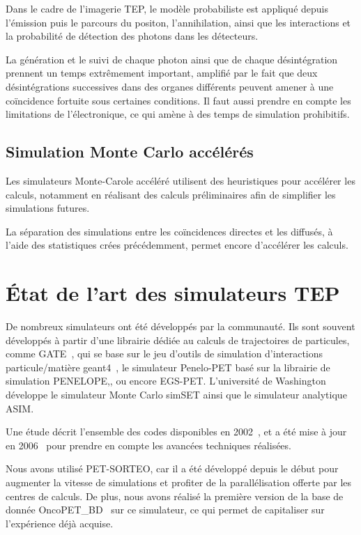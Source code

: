 Dans le cadre de l'imagerie TEP, le modèle probabiliste est appliqué depuis l'émission puis le parcours du positon, l'annihilation, ainsi que les interactions et la probabilité de détection des photons dans les détecteurs.

La génération et le suivi de chaque photon ainsi que de chaque désintégration prennent un temps extrêmement important, amplifié par le fait que deux désintégrations successives dans des organes différents peuvent amener à une coïncidence fortuite sous certaines conditions. Il faut aussi prendre en compte les limitations de l'électronique, ce qui amène à des temps de simulation prohibitifs.

		\subsection{Simulation Monte Carlo accélérés}

Les simulateurs Monte-Carole accéléré utilisent des heuristiques pour accélérer les calculs, notamment en réalisant des calculs préliminaires afin de simplifier les simulations futures. 

La séparation des simulations entre les coïncidences directes et les diffusés, à l’aide des statistiques crées précédemment, permet encore d’accélérer les calculs.

	\section{\'Etat de l'art des simulateurs TEP}

De nombreux simulateurs ont été développés par la communauté. Ils sont souvent développés à partir d'une librairie dédiée au calculs de trajectoires de particules, comme GATE~\cite{jan2004gate}, qui se base sur le jeu d'outils de simulation d'interactions particule/matière geant4~\cite{allison2006geant4}, le simulateur Penelo-PET\cite{espana2009penelopet} basé sur la librairie de simulation  PENELOPE,\cite{salvat2006penelope}, ou encore EGS-PET. L’université de Washington développe le simulateur Monte Carlo simSET ainsi que le simulateur analytique ASIM. 

Une étude décrit l'ensemble des codes disponibles en 2002~\cite{buvat2002monte}, et a été mise à jour en 2006~\cite{buvat2002monte} pour prendre en compte les avancées techniques réalisées.

Nous avons utilisé PET-SORTEO, car il a été développé depuis le début pour augmenter la vitesse de simulations et profiter de la parallélisation offerte par les centres de calculs. De plus, nous avons réalisé la première version de la base de donnée OncoPET\_BD~\cite{tomei2010oncopet_db} sur ce simulateur, ce qui permet de capitaliser sur l’expérience déjà acquise. 

